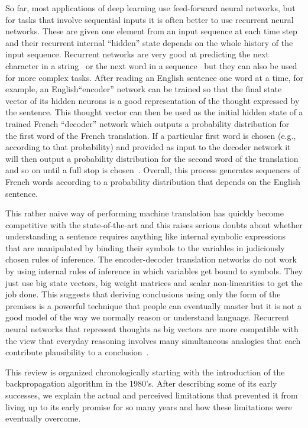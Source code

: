 \documentclass[]{article}
\begin{document}
So far, most applications of deep learning use feed-forward neural
networks, but for tasks that involve sequential inputs it is often better
to use recurrent neural networks. These are given one element from an input %
sequence at each time step and their recurrent internal ``hidden'' state
depends on the whole history of the input sequence. Recurrent networks are
very good at predicting the next character in a string~\citep{Sutskever-et-al-ICML2011} or
the next word in a sequence~\citep{Mikolov-et-al-NIPS2013} but they can also be used for
more complex tasks.  After reading an English sentence one word at a time,
for example, an English``encoder'' network can be trained so that the final
state vector of its hidden neurons is a good representation of the thought
expressed by the sentence.  This thought vector can then be used as the
initial hidden state of a trained French ``decoder'' network which outputs
a probability distribution for the first word of the French translation. If
a particular first word is chosen (e.g., according to that probability)
and provided as input to the decoder
network it will then output a probability distribution for the second word
of the translation and so on until a full stop is 
chosen~\citep{Vinyals-et-al-arxiv2014,Bahdanau-et-al-arxiv2014}. 
Overall, this process generates sequences of French words according to
a probability distribution that depends on the English sentence.

This rather naive way of performing machine translation has quickly become
competitive with the state-of-the-art and this raises serious doubts about
whether understanding a sentence requires anything like internal symbolic
expressions that are manipulated by binding their symbols to the variables
in judiciously chosen rules of inference.  The encoder-decoder translation
networks do not work by using internal rules of inference in which
variables get bound to symbols. They just use big state vectors, big weight
matrices and scalar non-linearities to get the job done.  This suggests
that deriving conclusions using only the form of the premises is a powerful
technique that people can eventually master but it is not a good model of
the way we normally reason or understand language. Recurrent neural
networks that represent thoughts as big vectors are more compatible with
the view that everyday reasoning involves many simultaneous analogies that
each contribute plausibility to a conclusion~\citep{metaphors}.

This review is organized chronologically starting with the introduction of
the backpropagation algorithm in the 1980's. After describing some of its
early successes, we explain the actual and perceived limitations that
prevented it from living up to its early promise for so many years and how
these limitations were eventually overcome.
\end{document}
